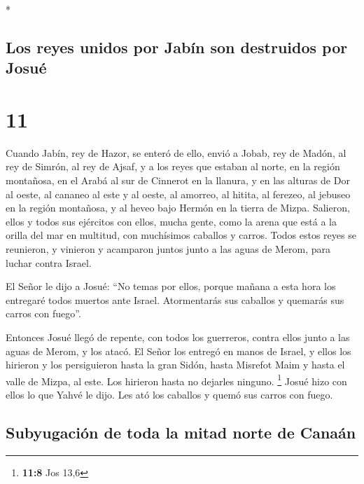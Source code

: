 \begin{paracol}{2}
\begin{otherlanguage}{english}
\end{otherlanguage}

\switchcolumn[0]*

\hypertarget{los-reyes-unidos-por-jabuxedn-son-destruidos-por-josuuxe9}{%
\subsection{Los reyes unidos por Jabín son destruidos por
Josué}\label{los-reyes-unidos-por-jabuxedn-son-destruidos-por-josuuxe9}}

\hypertarget{section-20}{%
\section{11}\label{section-20}}

 Cuando Jabín, rey de Hazor, se enteró de ello, envió a
Jobab, rey de Madón, al rey de Simrón, al rey de Ajsaf,  y
a los reyes que estaban al norte, en la región montañosa, en el Arabá al
sur de Cinnerot en la llanura, y en las alturas de Dor al oeste,
 al cananeo al este y al oeste, al amorreo, al hitita, al
ferezeo, al jebuseo en la región montañosa, y al heveo bajo Hermón en la
tierra de Mizpa.  Salieron, ellos y todos sus ejércitos
con ellos, mucha gente, como la arena que está a la orilla del mar en
multitud, con muchísimos caballos y carros.  Todos estos
reyes se reunieron, y vinieron y acamparon juntos junto a las aguas de
Merom, para luchar contra Israel.

 El Señor le dijo a Josué: ``No temas por ellos, porque
mañana a esta hora los entregaré todos muertos ante Israel. Atormentarás
sus caballos y quemarás sus carros con fuego''.

 Entonces Josué llegó de repente, con todos los guerreros,
contra ellos junto a las aguas de Merom, y los atacó.  El
Señor los entregó en manos de Israel, y ellos los hirieron y los
persiguieron hasta la gran Sidón, hasta Misrefot Maim y hasta el valle
de Mizpa, al este. Los hirieron hasta no dejarles ninguno. \footnote{\textbf{11:8}
  Jos 13,6}  Josué hizo con ellos lo que Yahvé le dijo.
Les ató los caballos y quemó sus carros con fuego.

\hypertarget{subyugaciuxf3n-de-toda-la-mitad-norte-de-canauxe1n}{%
\subsection{Subyugación de toda la mitad norte de
Canaán}\label{subyugaciuxf3n-de-toda-la-mitad-norte-de-canauxe1n}}


\end{paracol}
